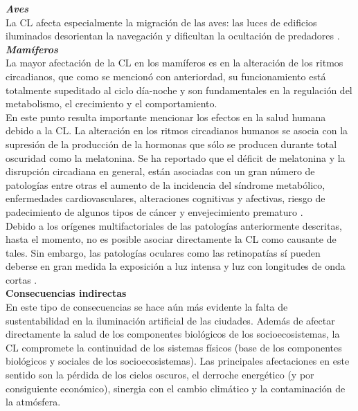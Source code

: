 \textit{\textbf{Aves}}\\

La CL afecta especialmente la migración de las aves: las luces de edificios iluminados desorientan la navegación y dificultan la ocultación de predadores \citep{Longcore2006}.\\

\textit{\textbf{Mamíferos}}\\

La mayor afectación de la CL en los mamíferos es en la alteración de los ritmos circadianos, que como se mencionó con anteriordad, su funcionamiento está totalmente supeditado al ciclo día-noche y son fundamentales en la regulación del metabolismo, el crecimiento y el comportamiento.\\

En este punto resulta importante mencionar los efectos en la salud humana debido a la CL. La alteración en los ritmos circadianos humanos se asocia con la supresión de la producción de la hormonas que sólo se producen durante total oscuridad como la melatonina. Se ha reportado que el déficit de melatonina y la disrupción circadiana en general, están asociadas con un gran número de patologías entre otras el aumento de la incidencia del síndrome metabólico, enfermedades cardiovasculares, alteraciones cognitivas y afectivas, riesgo de padecimiento de algunos tipos de cáncer y envejecimiento prematuro \citep{CEI2017,LibroCL}.\\

Debido a los orígenes multifactoriales de las patologías anteriormente descritas, hasta el momento, no es posible asociar directamente la CL como causante de tales. Sin embargo, las patologías oculares como las retinopatías sí pueden deberse en gran medida la exposición a luz intensa y luz con longitudes de onda cortas \citep{CEI2017}.\\


\textbf{Consecuencias indirectas}\\ 

En este tipo de consecuencias se hace aún más evidente la falta de sustentabilidad en la iluminación artificial de las ciudades. Además de afectar directamente la salud de los componentes biológicos de los socioecosistemas, la CL compromete la continuidad de los sistemas físicos (base de los componentes biológicos y sociales de los socioecosistemas). Las principales afectaciones en este sentido son la pérdida de los cielos oscuros, el derroche energético (y por consiguiente económico), sinergia con el cambio climático y la contaminación de la atmósfera.\\ 


